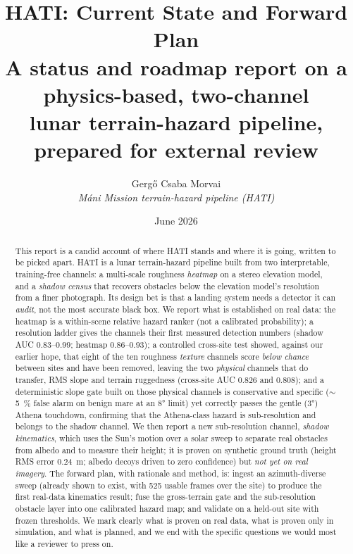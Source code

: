 \documentclass[11pt]{article}
\title{\sffamily\bfseries\color{hatiblue}\LARGE HATI: Current State and Forward Plan\\[3pt]
\Large\mdseries A status and roadmap report on a physics-based, two-channel\\ lunar terrain-hazard pipeline, prepared for external review}
\author{\large Gergő Csaba Morvai\\[2pt]
\normalsize\itshape M\'ani Mission terrain-hazard pipeline (HATI)}
\date{\normalsize June 2026}
\begin{document}
\maketitle

\begin{abstract}
\noindent
This report is a candid account of where HATI stands and where it is going, written to be
picked apart. HATI is a lunar terrain-hazard pipeline built from two interpretable,
training-free channels: a multi-scale roughness \emph{heatmap} on a stereo elevation model,
and a \emph{shadow census} that recovers obstacles below the elevation model's resolution from
a finer photograph. Its design bet is that a landing system needs a detector it can
\emph{audit}, not the most accurate black box. We report what is established on real data: the
heatmap is a within-scene relative hazard ranker (not a calibrated probability); a resolution
ladder gives the channels their first measured detection numbers (shadow AUC $0.83$--$0.99$;
heatmap $0.86$--$0.93$); a controlled cross-site test showed, against our earlier hope, that
eight of the ten roughness \emph{texture} channels score \emph{below chance} between sites and
have been removed, leaving the two \emph{physical} channels that do transfer, RMS slope and
terrain ruggedness (cross-site AUC $0.826$ and $0.808$);
and a deterministic slope gate built on those physical channels is conservative and specific
($\sim$\SI{5}{\percent} false alarm on benign mare at an \ang{8} limit) yet correctly passes
the gentle (\ang{3}) Athena touchdown, confirming that the Athena-class hazard is
sub-resolution and belongs to the shadow channel. We then report a new sub-resolution channel,
\emph{shadow kinematics}, which uses the Sun's motion over a solar sweep to separate real
obstacles from albedo and to measure their height; it is proven on synthetic ground truth
(height RMS error \SI{0.24}{\meter}; albedo decoys driven to zero confidence) but \emph{not yet
on real imagery}. The forward plan, with rationale and method, is: ingest an azimuth-diverse
sweep (already shown to exist, with 525 usable frames over the site) to produce the first
real-data kinematics result; fuse the gross-terrain gate and the sub-resolution obstacle layer
into one calibrated hazard map; and validate on a held-out site with frozen thresholds. We
mark clearly what is proven on real data, what is proven only in simulation, and what is
planned, and we end with the specific questions we would most like a reviewer to press on.
\end{abstract}
\end{document}
